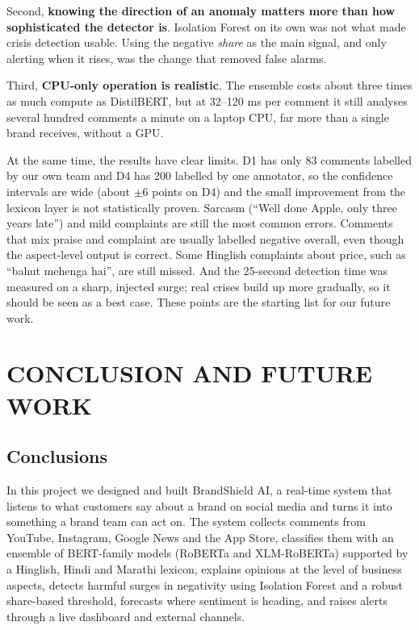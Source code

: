 \documentclass[12pt,a4paper]{report}
\begin{document}
Second, \textbf{knowing the direction of an anomaly matters more than how sophisticated the detector is}. Isolation Forest on its own was not what made crisis detection usable. Using the negative \textit{share} as the main signal, and only alerting when it rises, was the change that removed false alarms.

Third, \textbf{CPU-only operation is realistic}. The ensemble costs about three times as much compute as DistilBERT, but at 32--120 ms per comment it still analyses several hundred comments a minute on a laptop CPU, far more than a single brand receives, without a GPU.

At the same time, the results have clear limits. D1 has only 83 comments labelled by our own team and D4 has 200 labelled by one annotator, so the confidence intervals are wide (about $\pm$6 points on D4) and the small improvement from the lexicon layer is not statistically proven. Sarcasm (``Well done Apple, only three years late'') and mild complaints are still the most common errors. Comments that mix praise and complaint are usually labelled negative overall, even though the aspect-level output is correct. Some Hinglish complaints about price, such as ``bahut mehenga hai'', are still missed. And the 25-second detection time was measured on a sharp, injected surge; real crises build up more gradually, so it should be seen as a best case. These points are the starting list for our future work.

\chapter{CONCLUSION AND \vspace*{0.5\baselineskip} FUTURE WORK}

\section{Conclusions}

In this project we designed and built BrandShield AI, a real-time system that listens to what customers say about a brand on social media and turns it into something a brand team can act on. The system collects comments from YouTube, Instagram, Google News and the App Store, classifies them with an ensemble of BERT-family models (RoBERTa and XLM-RoBERTa) supported by a Hinglish, Hindi and Marathi lexicon, explains opinions at the level of business aspects, detects harmful surges in negativity using Isolation Forest and a robust share-based threshold, forecasts where sentiment is heading, and raises alerts through a live dashboard and external channels.
\end{document}
